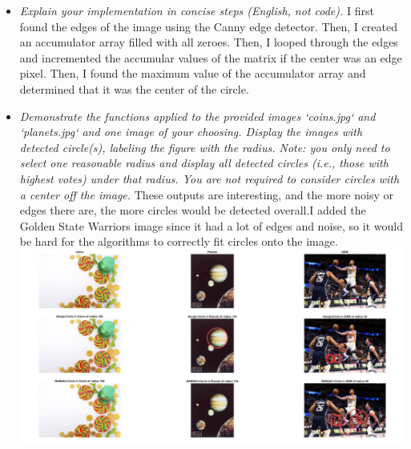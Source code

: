 \documentclass[11pt]{article}
\begin{document}
    \begin{itemize}
        \item \textit{Explain your implementation in concise steps (English, not code).}\newline
        I first found the edges of the image using the Canny edge detector. Then, I created an accumulator
        array filled with all zeroes. Then, I looped through the edges and incremented the accumular values of the
        matrix if the center was an edge pixel. Then, I found the maximum value of the accumulator array and
        determined that it was the center of the circle.\newline

        \item \textit{Demonstrate the functions applied to the provided images ‘coins.jpg‘ and ‘planets.jpg‘ and one
        image of your choosing. Display the images with detected circle(s), labeling the figure with the radius.
        Note: you only need to select one reasonable radius and display all detected circles
            (i.e., those with highest votes) under that radius.
            You are not required to consider circles with a center off the image.}\newline
        These outputs are interesting, and the more noisy or edges there are, the more circles would be detected
        overall.\newline I added the Golden State Warriors image since it had a lot of edges and noise, so it would
        be hard for the algorithms to correctly fit circles onto the image.\newline
        \includegraphics[width=\textwidth]{Output Pictures/detection_output}\newline


\end{itemize}
\end{document}
